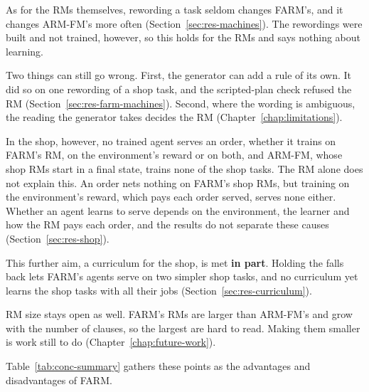 \documentclass[11pt,english,listoffigures,listoftables]{tfgetsinf}
\begin{document}
As for the RMs themselves, rewording a task seldom changes FARM's, and it changes ARM-FM's more often (Section~\ref{sec:res-machines}). The rewordings were built and not trained, however, so this holds for the RMs and says nothing about learning.

Two things can still go wrong. First, the generator can add a rule of its own. It did so on one rewording of a shop task, and the scripted-plan check refused the RM (Section~\ref{sec:res-farm-machines}). Second, where the wording is ambiguous, the reading the generator takes decides the RM (Chapter~\ref{chap:limitations}).

In the shop, however, no trained agent serves an order, whether it trains on FARM's RM, on the environment's reward or on both, and ARM-FM, whose shop RMs start in a final state, trains none of the shop tasks. The RM alone does not explain this. An order nets nothing on FARM's shop RMs, but training on the environment's reward, which pays each order served, serves none either. Whether an agent learns to serve depends on the environment, the learner and how the RM pays each order, and the results do not separate these causes (Section~\ref{sec:res-shop}).

This further aim, a curriculum for the shop, is met \textbf{in part}. Holding the falls back lets FARM's agents serve on two simpler shop tasks, and no curriculum yet learns the shop tasks with all their jobs (Section~\ref{sec:res-curriculum}).

RM size stays open as well. FARM's RMs are larger than ARM-FM's and grow with the number of clauses, so the largest are hard to read. Making them smaller is work still to do (Chapter~\ref{chap:future-work}).

Table~\ref{tab:conc-summary} gathers these points as the advantages and disadvantages of FARM.
\end{document}
